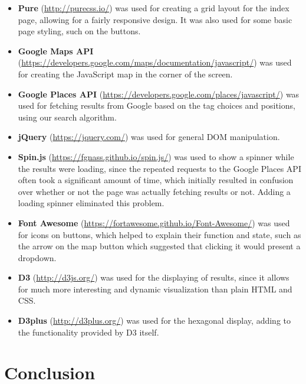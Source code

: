 \documentclass[10pt,a4paper]{article}
\begin{document}
\begin{itemize}
	\item \textbf{Pure} (\url{http://purecss.io/}) was used for creating a grid layout for the index page, allowing for a fairly responsive design. It was also used for some basic page styling, such on the buttons.
	\item \textbf{Google Maps API} (\url{https://developers.google.com/maps/documentation/javascript/}) was used for creating the JavaScript map in the corner of the screen.
	\item \textbf{Google Places API} (\url{https://developers.google.com/places/javascript/}) was used for fetching results from Google based on the tag choices and positions, using our search algorithm.
	\item \textbf{jQuery} (\url{https://jquery.com/}) was used for general DOM manipulation.
	\item \textbf{Spin.js} (\url{https://fgnass.github.io/spin.js/}) was used to show a spinner while the results were loading, since the repeated requests to the Google Places API often took a significant amount of time, which initially resulted in confusion over whether or not the page was actually fetching results or not. Adding a loading spinner eliminated this problem.
	\item \textbf{Font Awesome} (\url{https://fortawesome.github.io/Font-Awesome/}) was used for icons on buttons, which helped to explain their function and state, such as the arrow on the map button which suggested that clicking it would present a dropdown.
	\item \textbf{D3} (\url{http://d3js.org/}) was used for the displaying of results, since it allows for much more interesting and dynamic visualization than plain HTML and CSS.
	\item \textbf{D3plus} (\url{http://d3plus.org/}) was used for the hexagonal display, adding to the functionality provided by D3 itself.
\end{itemize}

\section*{Conclusion}
\end{document}
